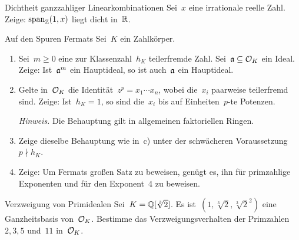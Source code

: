 \documentclass{uebblatt}
\begin{document}

\begin{aufgabe}{Dichtheit ganzzahliger Linearkombinationen}
Sei~$x$ eine irrationale reelle Zahl. Zeige: $\operatorname{span}_{\mathbb{Z}}(1,x)$
liegt dicht in~$\mathbb{R}$.
\end{aufgabe}

\begin{aufgabe}{Auf den Spuren Fermats}
Sei~$K$ ein Zahlkörper.
\begin{enumerate}
\item Sei~$m \geq 0$ eine zur Klassenzahl~$h_K$
teilerfremde Zahl. Sei~$\mathfrak{a} \subseteq \mathcal{O}_K$ ein Ideal. Zeige: Ist~$\mathfrak{a}^m$ ein
Hauptideal, so ist auch~$\mathfrak{a}$ ein Hauptideal.
\item Gelte in~$\mathcal{O}_K$ die Identität~$z^p = x_1 \cdots x_n$,
wobei die~$x_i$ paarweise teilerfremd sind. Zeige: Ist~$h_K = 1$,
so sind die~$x_i$ bis auf Einheiten~$p$-te Potenzen.

{\tiny\emph{Hinweis.} Die Behauptung gilt in allgemeinen faktoriellen
Ringen.\par}
\item Zeige dieselbe Behauptung wie in~c) unter der schwächeren Voraussetzung~$p \nmid h_K$.
\item Zeige: Um Fermats großen Satz zu beweisen, genügt es, ihn für primzahlige
Exponenten und für den Exponent~4 zu beweisen.
\end{enumerate}
\end{aufgabe}

\begin{aufgabe}{Verzweigung von Primidealen}
Sei~$K = \mathbb{Q}[\sqrt[3]{2}]$. Es ist~$(1,\sqrt[3]{2},\sqrt[3]{2}^2)$ eine
Ganzheitsbasis von~$\mathcal{O}_K$. Bestimme das Verzweigungsverhalten der
Primzahlen~$2, 3, 5$ und~$11$ in~$\mathcal{O}_K$.
\end{aufgabe}
\end{document}
